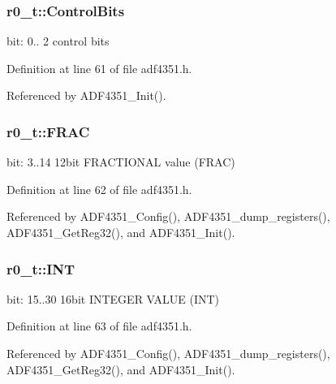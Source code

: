 \subsubsection[{\texorpdfstring{Control\+Bits}{ControlBits}}]{ r0\+\_\+t\+::\+Control\+Bits}\hypertarget{structr0__t_aad2911768ed7dd38e899b81d517dda08}{}\label{structr0__t_aad2911768ed7dd38e899b81d517dda08}
bit\+: 0.. 2 control bits 

Definition at line 61 of file adf4351.\+h.



Referenced by A\+D\+F4351\+\_\+\+Init().

\subsubsection[{\texorpdfstring{F\+R\+AC}{FRAC}}]{ r0\+\_\+t\+::\+F\+R\+AC}\hypertarget{structr0__t_adc22c0b86ef296065f01c8800d4f5d52}{}\label{structr0__t_adc22c0b86ef296065f01c8800d4f5d52}
bit\+: 3..14 12bit F\+R\+A\+C\+T\+I\+O\+N\+AL value (F\+R\+AC) 

Definition at line 62 of file adf4351.\+h.



Referenced by A\+D\+F4351\+\_\+\+Config(), A\+D\+F4351\+\_\+dump\+\_\+registers(), A\+D\+F4351\+\_\+\+Get\+Reg32(), and A\+D\+F4351\+\_\+\+Init().

\subsubsection[{\texorpdfstring{I\+NT}{INT}}]{ r0\+\_\+t\+::\+I\+NT}\hypertarget{structr0__t_a1d7f06769cdf259c9858033cb164e31d}{}\label{structr0__t_a1d7f06769cdf259c9858033cb164e31d}
bit\+: 15..30 16bit I\+N\+T\+E\+G\+ER V\+A\+L\+UE (I\+NT) 

Definition at line 63 of file adf4351.\+h.



Referenced by A\+D\+F4351\+\_\+\+Config(), A\+D\+F4351\+\_\+dump\+\_\+registers(), A\+D\+F4351\+\_\+\+Get\+Reg32(), and A\+D\+F4351\+\_\+\+Init().

